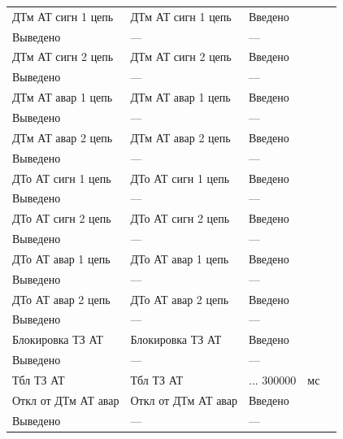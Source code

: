 \begin{longtable}{|>{\centering\arraybackslash}m{5.3cm}|>{\centering\arraybackslash}m{3.3cm}|>{\centering\arraybackslash}m{4.2cm}|>{\centering\arraybackslash}m{1.8cm}|>{\centering\arraybackslash}m{1cm}|}
\multicolumn{5}{|c|}{ ТЗ АТ } \\ \hline 
\raggedright ДТм АТ сигн 1 цепь & \centering ДТм АТ сигн 1 цепь & \centering Введено \\ Выведено & \centering --- & \centering \arraybackslash --- \\
\hline
\raggedright ДТм АТ сигн 2 цепь & \centering ДТм АТ сигн 2 цепь & \centering Введено \\ Выведено & \centering --- & \centering \arraybackslash --- \\
\hline
\raggedright ДТм АТ авар 1 цепь & \centering ДТм АТ авар 1 цепь & \centering Введено \\ Выведено & \centering --- & \centering \arraybackslash --- \\
\hline
\raggedright ДТм АТ авар 2 цепь & \centering ДТм АТ авар 2 цепь & \centering Введено \\ Выведено & \centering --- & \centering \arraybackslash --- \\
\hline
\raggedright ДТо АТ сигн 1 цепь & \centering ДТо АТ сигн 1 цепь & \centering Введено \\ Выведено & \centering --- & \centering \arraybackslash --- \\
\hline
\raggedright ДТо АТ сигн 2 цепь & \centering ДТо АТ сигн 2 цепь & \centering Введено \\ Выведено & \centering --- & \centering \arraybackslash --- \\
\hline
\raggedright ДТо АТ авар 1 цепь & \centering ДТо АТ авар 1 цепь & \centering Введено \\ Выведено & \centering --- & \centering \arraybackslash --- \\
\hline
\raggedright ДТо АТ авар 2 цепь & \centering ДТо АТ авар 2 цепь & \centering Введено \\ Выведено & \centering --- & \centering \arraybackslash --- \\
\hline
\raggedright Блокировка ТЗ АТ & \centering Блокировка ТЗ АТ & \centering Введено \\ Выведено & \centering --- & \centering \arraybackslash --- \\
\hline
\raggedright Тбл ТЗ АТ & \centering Тбл ТЗ АТ & \centering 0 ... 300000 & \centering мс & \centering \arraybackslash 5 \\
\hline
\raggedright Откл от ДТм АТ авар & \centering Откл от ДТм АТ авар & \centering Введено \\ Выведено & \centering --- & \centering \arraybackslash --- \\

\end{longtable}
